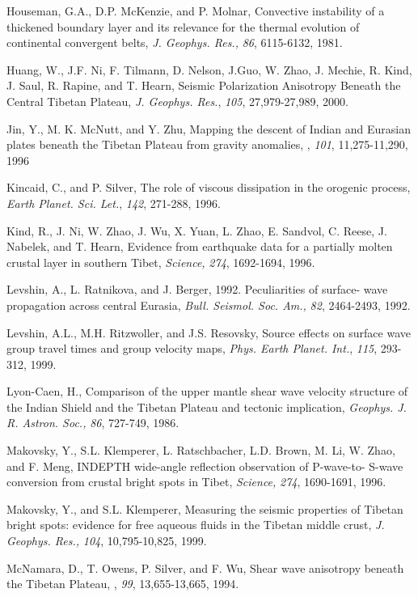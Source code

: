 \documentclass[12pt]{article}
\begin{document}
\begin{references}
Houseman, G.A., D.P. McKenzie, and P. Molnar, Convective instability
of a thickened boundary layer and its relevance for the thermal evolution of
continental convergent belts, {\it J. Geophys. Res.,} {\it 86}, 6115-6132, 1981.

Huang, W., J.F. Ni, F. Tilmann, D. Nelson, J.Guo, W. Zhao, J. Mechie,
R. Kind, J. Saul, R. Rapine, and T. Hearn, Seismic Polarization 
Anisotropy Beneath the Central Tibetan Plateau, {\it J. Geophys. Res.},
{\it 105}, 27,979-27,989, 2000.

Jin, Y., M. K. McNutt, and Y. Zhu, Mapping the descent of Indian and
Eurasian plates beneath the Tibetan Plateau from gravity anomalies,
\jgr, {\it 101}, 11,275-11,290, 1996

Kincaid, C., and P. Silver, The role of viscous dissipation in the orogenic
process, {\it Earth Planet. Sci. Let.}, {\it 142}, 271-288, 1996.

Kind, R., J. Ni, W. Zhao, J. Wu, X. Yuan, L. Zhao, E. Sandvol, C. Reese,
J. Nabelek, and T. Hearn, Evidence from earthquake data for a partially
molten crustal layer in southern Tibet, {\it Science,} {\it 274}, 1692-1694,
1996.

Levshin, A., L. Ratnikova, and J. Berger, 1992. Peculiarities of surface-
wave propagation across central Eurasia, {\it Bull. Seismol. Soc. Am.,}
{\it 82}, 2464-2493, 1992.

Levshin, A.L., M.H. Ritzwoller, and J.S. Resovsky, Source effects on
surface wave group travel times and group velocity maps, {\it Phys.
Earth Planet. Int.}, {\it 115}, 293-312, 1999.

Lyon-Caen, H., Comparison of the upper mantle shear wave velocity
structure of the Indian Shield and the Tibetan Plateau and tectonic
implication, {\it Geophys. J. R. Astron. Soc.,} {\it 86}, 727-749, 1986.

Makovsky, Y., S.L. Klemperer, L. Ratschbacher, L.D. Brown, M. Li, W. Zhao,
and F. Meng, INDEPTH wide-angle reflection observation of P-wave-to-
S-wave conversion from crustal bright spots in Tibet, {\it Science,} {\it 274},
1690-1691, 1996.

Makovsky, Y., and S.L. Klemperer, Measuring the seismic properties
of Tibetan bright spots: evidence for free aqueous fluids in the Tibetan
middle crust, {\it J. Geophys. Res.,} {\it 104}, 10,795-10,825, 1999.

McNamara, D., T. Owens, P. Silver, and F. Wu, Shear wave
anisotropy beneath the Tibetan
Plateau, \jgr, {\it 99}, 13,655-13,665, 1994.


\end{references}
\end{document}
